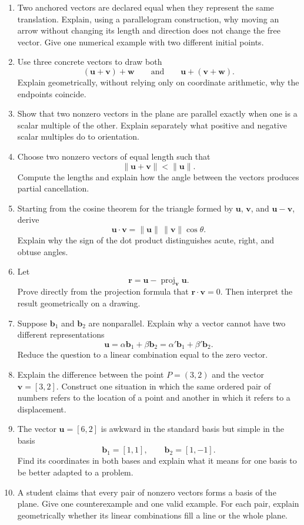\begin{enumerate}

\item Two anchored vectors are declared equal when they represent the same
translation. Explain, using a parallelogram construction, why moving an arrow
without changing its length and direction does not change the free vector.
Give one numerical example with two different initial points.

\item Use three concrete vectors to draw both
\[
(\mathbf u+\mathbf v)+\mathbf w
\qquad\text{and}\qquad
\mathbf u+(\mathbf v+\mathbf w).
\]
Explain geometrically, without relying only on coordinate arithmetic, why the
endpoints coincide.

\item Show that two nonzero vectors in the plane are parallel exactly when one
is a scalar multiple of the other. Explain separately what positive and
negative scalar multiples do to orientation.

\item Choose two nonzero vectors of equal length such that
\[
\|\mathbf u+\mathbf v\|<\|\mathbf u\|.
\]
Compute the lengths and explain how the angle between the vectors produces
partial cancellation.

\item Starting from the cosine theorem for the triangle formed by
$\mathbf u$, $\mathbf v$, and $\mathbf u-\mathbf v$, derive
\[
\mathbf u\cdot\mathbf v
=\|\mathbf u\|\,\|\mathbf v\|\cos\theta.
\]
Explain why the sign of the dot product distinguishes acute, right, and obtuse
angles.

\item Let
\[
\mathbf r
=\mathbf u-\operatorname{proj}_{\mathbf v}\mathbf u.
\]
Prove directly from the projection formula that $\mathbf r\cdot\mathbf v=0$.
Then interpret the result geometrically on a drawing.

\item Suppose $\mathbf b_1$ and $\mathbf b_2$ are nonparallel. Explain why a
vector cannot have two different representations
\[
\mathbf u=\alpha\mathbf b_1+\beta\mathbf b_2
=\alpha'\mathbf b_1+\beta'\mathbf b_2.
\]
Reduce the question to a linear combination equal to the zero vector.

\item Explain the difference between the point $P=(3,2)$ and the vector
$\mathbf v=[3,2]$. Construct one situation in which the same ordered pair of
numbers refers to the location of a point and another in which it refers to a
displacement.

\item The vector $\mathbf u=[6,2]$ is awkward in the standard basis but simple
in the basis
\[
\mathbf b_1=[1,1],\qquad \mathbf b_2=[1,-1].
\]
Find its coordinates in both bases and explain what it means for one basis to
be better adapted to a problem.

\item A student claims that every pair of nonzero vectors forms a basis of the
plane. Give one counterexample and one valid example. For each pair, explain
geometrically whether its linear combinations fill a line or the whole plane.

\end{enumerate}
